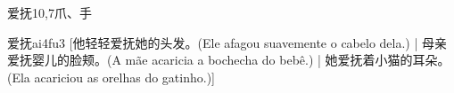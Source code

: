 \begin{entry}{爱抚}{10,7}{⽖、⼿}
  \begin{phonetics}{爱抚}{ai4fu3}
    [他轻轻爱抚她的头发。(Ele afagou suavemente o cabelo dela.) | 母亲爱抚婴儿的脸颊。(A mãe acaricia a bochecha do bebê.) | 她爱抚着小猫的耳朵。(Ela acariciou as orelhas do gatinho.)]
  \end{phonetics}
\end{entry}
